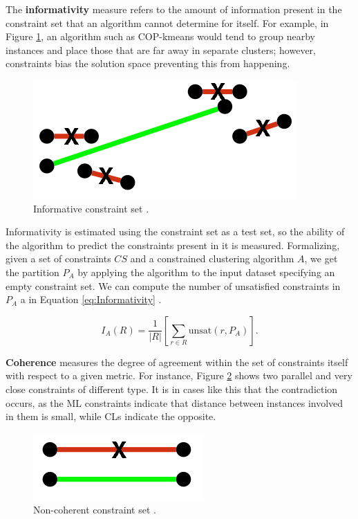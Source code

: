 The \textbf{informativity} measure refers to the amount of information present in the constraint set that an algorithm cannot determine for itself. For example, in Figure \ref{fig:Informativity}, an algorithm such as COP-kmeans would tend to group nearby instances and place those that are far away in separate clusters; however, constraints bias the solution space preventing this from happening. 

\begin{figure}[!h]
	\centering
	\includegraphics[scale=0.4]{gfx/ConstClust/Inform/Inform} 
	\caption[Informative constraint set.]{Informative constraint set \cite{davidson2007survey}.}\label{fig:Informativity}
\end{figure}


Informativity is estimated using the constraint set as a test set, so the ability of the algorithm to predict the constraints present in it is measured. Formalizing, given a set of constraints $CS$ and a constrained clustering algorithm $A$, we get the partition $P_A$ by applying the algorithm to the input dataset specifying an empty constraint set. We can compute the number of unsatisfied constraints in $P_A$ a in Equation \ref{eq:Informativity} \cite{davidson2007survey}.

\begin{equation}
I_A(R) = \frac{1}{|R|}\left[ \sum_{r \in R} \text{unsat}(r, P_A) \right].
\label{eq:Informativity}
\end{equation}

\textbf{Coherence} measures the degree of agreement within the set of constraints itself with respect to a given metric. For instance, Figure \ref{fig:Coherence} shows two parallel and very close constraints of different type. It is in cases like this that the contradiction occurs, as the \acs{ML} constraints indicate that distance between instances involved in them is small, while \acs{CL}s indicate the opposite.

\begin{figure}[!h]
	\centering
	\includegraphics[scale=0.4]{gfx/ConstClust/Coherencia/Coher1}
	\caption[Non-coherent constraint set.]{Non-coherent constraint set \cite{davidson2007survey}.}\label{fig:Coherence}
\end{figure}

